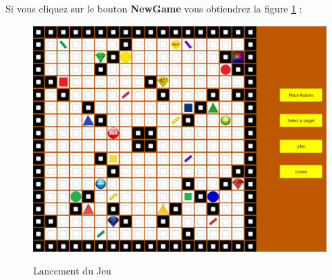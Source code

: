 \documentclass[12pt, a4paper, openany]{article}
\begin{document}
Si vous cliquez sur le bouton \textbf{NewGame} vous obtiendrez la figure \ref{fig:Jeu} :\\
\begin{figure}[H]
\begin{center}
 \includegraphics[scale=0.4]{Screen2.png}
    \\[1cm]     
   
\end{center}  
\caption{Lancement du Jeu}
\label{fig:Jeu}  
\end{figure}
\end{document}
